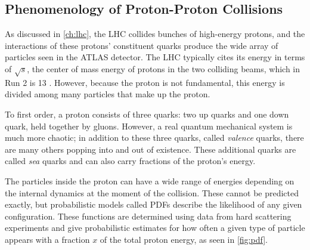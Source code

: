 



\subsection{Phenomenology of Proton-Proton Collisions}
\label{sec:pp_collisions}

As discussed in \autoref{ch:lhc}, the \ac{LHC} collides bunches of high-energy protons, and the interactions of these protons' constituent quarks produce the wide array of particles seen in the \ac{ATLAS} detector. The \ac{LHC} typically cites its energy in terms of $\sqrt{s}$, the center of mass energy of protons in the two colliding beams, which in Run 2 is 13 \tev. However, because the proton is not fundamental, this energy is divided among many particles that make up the proton. 

To first order, a proton consists of three quarks: two up quarks and one down quark, held together by gluons. However, a real quantum mechanical system is much more chaotic; in addition to these three quarks, called \textit{valence} quarks, there are many others popping into and out of existence. These additional quarks are called \textit{sea} quarks and can also carry fractions of the proton's energy.

The particles inside the proton can have a wide range of energies depending on the internal dynamics at the moment of the collision. These cannot be predicted exactly, but probabilistic models called \acfp{PDF} describe the likelihood of any given configuration. These functions are determined using data from hard scattering experiments and give probabilistic estimates for how often a given type of particle appears with a fraction $x$ of the total proton energy, as seen in \autoref{fig:pdf}. 

